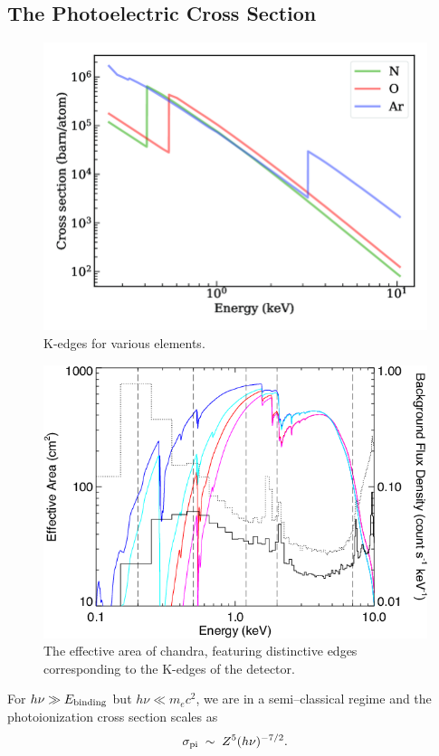 \subsection{The Photoelectric Cross Section}

\begin{figure}[th!]
    \centering
    \includegraphics[width=0.75\linewidth]{Pictures/figures/photo_ion_cross_section.png}
    \caption{K-edges for various elements.}
    \label{fig:k_edges_photo_ionization}
\end{figure}

\begin{figure}
    \centering
    \includegraphics[width=0.75\linewidth]{Pictures//figures/chandra_effective_area.png}
    \caption{The effective area of chandra, featuring distinctive edges corresponding to the K-edges of the detector.}
    \label{fig:chandra_effective_area}
\end{figure}

For $h\nu \gg E_{\rm binding}$ but $h\nu \ll m_e c^2$, we are in a
semi--classical regime and the photoionization cross section scales as
\[
    \sigma_{\rm pi} \;\sim\; Z^5 (h\nu)^{-7/2}.
\]

